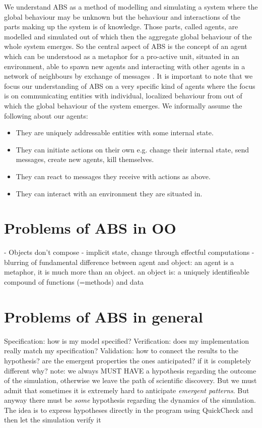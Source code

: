 We understand ABS as a method of modelling and simulating a system where the global behaviour may be unknown but the behaviour and interactions of the parts making up the system is of knowledge. Those parts, called agents, are modelled and simulated out of which then the aggregate global behaviour of the whole system emerges. So the central aspect of ABS is the concept of an agent which can be understood as a metaphor for a pro-active unit, situated in an environment, able to spawn new agents and interacting with other agents in a network of neighbours by exchange of messages \cite{wooldridge_introduction_2009}. It is important to note that we focus our understanding of ABS on a very specific kind of agents where the focus is on communicating entities with individual, localized behaviour from out of which the global behaviour of the system emerges. We informally assume the following about our agents:

\begin{itemize}
	\item They are uniquely addressable entities with some internal state.
	\item They can initiate actions on their own e.g. change their internal state, send messages, create new agents, kill themselves.
	\item They can react to messages they receive with actions as above.
	\item They can interact with an environment they are situated in.
\end{itemize} 

\section{Problems of ABS in OO}
- Objects don't compose
- implicit state, change through effectful computations
- blurring of fundamental difference between agent and object: an agent is a metaphor, it is much more than an object. an object is: a uniquely identifieable compound of functions (=methods) and data

\section{Problems of ABS in general}
Specification: how is my model specified? 
Verification: does my implementation really match my specification? 
Validation: how to connect the results to the hypothesis? are the emergent properties the ones anticipated? if it is completely different why? note: we always MUST HAVE a hypothesis regarding the outcome of the simulation, otherwise we leave the path of scientific discovery. But we must admit that sometimes it is extremely hard to anticipate \textit{emergent patterns}. But anyway there must be \textit{some} hypothesis regarding the dynamics of the simulation.
The idea is to express hypotheses directly in the program using QuickCheck and then let the simulation verify it

